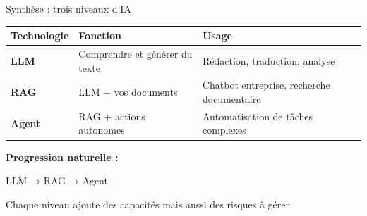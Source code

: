 \begin{frame}{Synthèse : trois niveaux d'IA}

\begin{table}
\small
\begin{tabular}{l|p{3.5cm}|p{3.5cm}}
\textbf{Technologie} & \textbf{Fonction} & \textbf{Usage} \\
\hline
\textbf{LLM} & Comprendre et générer du texte & Rédaction, traduction, analyse \\
\hline
\textbf{RAG} & LLM + vos documents & Chatbot entreprise, recherche documentaire \\
\hline
\textbf{Agent} & RAG + actions autonomes & Automatisation de tâches complexes \\
\hline
\end{tabular}
\end{table}

\vspace{0.5cm}

\textbf{Progression naturelle :}
\begin{center}
LLM → RAG → Agent
\end{center}

\vspace{0.3cm}

Chaque niveau ajoute des capacités mais aussi des risques à gérer

\end{frame}